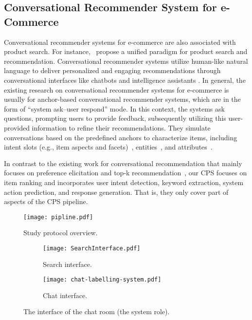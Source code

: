 \subsection{Conversational Recommender System for e-Commerce} Conversational recommender systems for e-commerce are also associated with product search. For instance,~\citet{zhang2018towards} propose a unified paradigm for product search and recommendation. Conversational recommender systems utilize human-like natural language to deliver personalized and engaging recommendations through conversational interfaces like chatbots and intelligence assistants \citep{gao2021advances,jannach2021survey}. In general, the existing research on conversational recommender systems for e-commerce is usually for anchor-based conversational recommender systems, which are in the form of ``system ask--user respond'' mode. In this context, the systems ask questions, prompting users to provide feedback, subsequently utilizing this user-provided information to refine their recommendations. They simulate conversations based on the predefined anchors to characterize items, including intent slots (e.g., item aspects and facets)~\citep{zhang2018towards}, entities~\citep{zou2020towardsb}, and attributes~\citep{zhang2022multiple}. 

In contrast to the existing work for conversational recommendation that mainly focuses on preference elicitation and top-k recommendation~\cite{radlinski2019coached,sun2018conversational}, our \ac{CPS} focuses on item ranking and incorporates user intent detection, keyword extraction, system action prediction, and response generation. That is, they only cover part of aspects of the \ac{CPS} pipeline. 

\begin{figure}[t]
\centering
\texttt{[image: pipline.pdf]}
\caption{Study protocol overview.}
\label{fig:pipline}
\end{figure}

\begin{figure*}[tb]
\centering
\begin{subfigure}{0.228\textwidth}%
    \texttt{[image: SearchInterface.pdf]}
    \caption{Search interface.}
\end{subfigure}
\begin{subfigure}{0.62\textwidth}%
    \texttt{[image: chat-labelling-system.pdf]}
    \caption{Chat interface.}
\end{subfigure}
\caption{The interface of the chat room (the system role).}
\label{fig:sysinterface}
\end{figure*}

